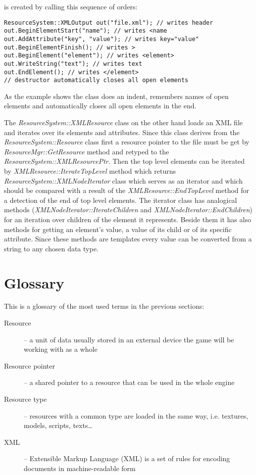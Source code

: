 \noindent is created by calling this sequence of orders:

\begin{verbatim}
ResourceSystem::XMLOutput out("file.xml"); // writes header
out.BeginElementStart("name"); // writes <name
out.AddAttribute("key", "value"); // writes key="value"
out.BeginElementFinish(); // writes >
out.BeginElement("element"); // writes <element>
out.WriteString("text"); // writes text
out.EndElement(); // writes </element>
// destructor automatically closes all open elements
\end{verbatim}

\noindent As the example shows the class does an indent, remembers names of open elements and automatically closes all open elements in the end.

The \emph{ResourceSystem::XMLResource} class on the other hand loads an XML file and iterates over its elements and attributes. Since this class derives from the \emph{ResourceSystem::Resource} class first a resource pointer to the file must be get by \emph{ResourceMgr::GetResource} method and retyped to the \emph{ResourceSystem::XMLResourcePtr}. Then the top level elements can be iterated by \emph{XMLResource::IterateTopLevel} method which returns \emph{ResourceSystem::XMLNodeIterator} class which serves as an iterator and which should be compared with a result of the \emph{XMLResource::EndTopLevel} method for a detection of the end of top level elements. The iterator class has analogical methods (\emph{XMLNodeIterator::IterateChildren} and \emph{XMLNodeIterator::EndChildren}) for an iteration over children of the element it represents. Beside them it has also methods for getting an element's value, a value of its child or of its specific attribute. Since these methods are templates every value can be converted from a string to any chosen data type.

\section{Glossary}
This is a glossary of the most used terms in the previous sections:

\begin{description}
  \item[Resource] -- a unit of data usually stored in an external device the game will be working with as a whole
  \item[Resource pointer] -- a shared pointer to a resource that can be used in the whole engine
  \item[Resource type] -- resources with a common type are loaded in the same way, i.e. textures, models, scripts, texts\ldots
  \item[XML] -- Extensible Markup Language (XML) is a set of rules for encoding documents in machine-readable form
\end{description}